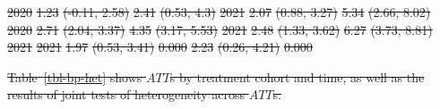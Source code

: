 \documentclass[
  letterpaper,
  DIV=11,
  numbers=noendperiod]{scrartcl}
\providecommand{\DIFdeltex}[1]{{\protect\color{red}\sout{#1}}}                      %
\providecommand{\DIFdelFL}[1]{\DIFdel{#1}} %
\providecommand{\DIFdel}[1]{\texorpdfstring{\DIFdeltex{#1}}{}} %
\begin{document}
\DIFdelFL{2020 }%
\DIFdelFL{1.23 }%
\DIFdelFL{(-0.11, 2.58) }%
\DIFdelFL{2.41 }%
\DIFdelFL{(0.53, 4.3) }%
\DIFdelFL{2021 }%
\DIFdelFL{2.07 }%
\DIFdelFL{(0.88, 3.27) }%
\DIFdelFL{5.34 }%
\DIFdelFL{(2.66, 8.02) }%
\DIFdelFL{2020 }%
\DIFdelFL{2.71 }%
\DIFdelFL{(2.04, 3.37) }%
\DIFdelFL{4.35 }%
\DIFdelFL{(3.17, 5.53) }%
\DIFdelFL{2021 }%
\DIFdelFL{2.48 }%
\DIFdelFL{(1.33, 3.62) }%
\DIFdelFL{6.27 }%
\DIFdelFL{(3.73, 8.81) }%
\DIFdelFL{\hspace{1em}2021 }%
\DIFdelFL{2021 }%
\DIFdelFL{1.97 }%
\DIFdelFL{(0.53, 3.41) }%
\DIFdelFL{0.000 }%
\DIFdelFL{2.23 }%
\DIFdelFL{(0.26, 4.21) }%
\DIFdelFL{0.000}%



\DIFdel{Table~\ref{tbl-bp-het} shows \(ATT\)s by treatment cohort and time, as
well as the results of joint tests of heterogeneity across \(ATT\)s.
}%
\end{document}
